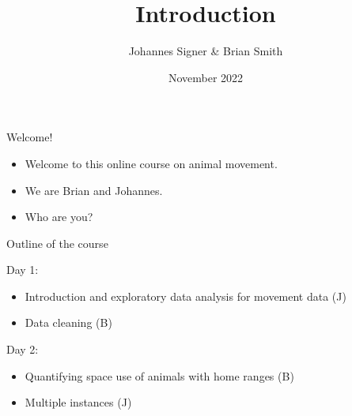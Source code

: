 \documentclass[ignorenonframetext,,t]{beamer}
\title{Introduction}
\author{Johannes Signer \& Brian Smith}
\date{November 2022}
\providecommand{\tightlist}{%
\setlength{\itemsep}{0pt}\setlength{\parskip}{0pt}}
\providecommand{\tightlist}{%
\setlength{\itemsep}{0pt}\setlength{\parskip}{0pt}}
\renewcommand{\tightlist}{\setlength{\itemsep}{1.4ex}\setlength{\parskip}{0pt}}
\begin{document}
\frame{\titlepage}



\begin{frame}{Welcome!}
\protect\hypertarget{welcome}{}
\begin{itemize}
\tightlist
\item
  Welcome to this online course on animal movement.
\item
  We are Brian and Johannes.
\item
  Who are you?
\end{itemize}
\end{frame}

\begin{frame}{Outline of the course}
\protect\hypertarget{outline-of-the-course}{}
\begin{block}{Day 1:}
\protect\hypertarget{day-1}{}
\begin{itemize}
\tightlist
\item
  Introduction and exploratory data analysis for movement data (J)
\item
  Data cleaning (B)
\end{itemize}
\end{block}

\begin{block}{Day 2:}
\protect\hypertarget{day-2}{}
\begin{itemize}
\tightlist
\item
  Quantifying space use of animals with home ranges (B)
\item
  Multiple instances (J)
\end{itemize}
\end{block}
\end{frame}
\end{document}
